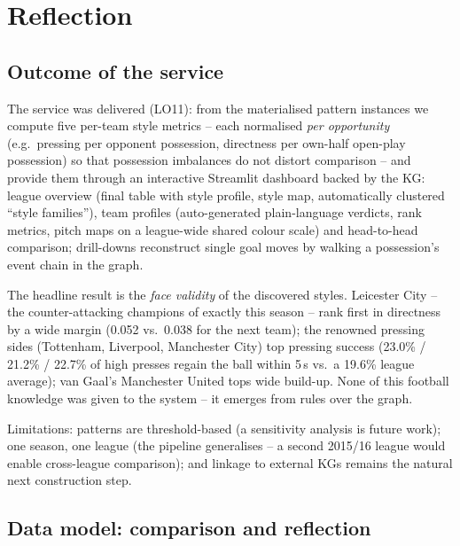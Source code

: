\documentclass[11pt,a4paper]{article}
\begin{document}
\section{Reflection}

\subsection{Outcome of the service}
\label{sec:service-outcome}

The service was delivered (LO11): from the materialised pattern instances we
compute five per-team style metrics -- each normalised \emph{per opportunity}
(e.g.\ pressing per opponent possession, directness per own-half open-play
possession) so that possession imbalances do not distort comparison -- and
provide them through an interactive Streamlit dashboard backed by the KG:
league overview (final table with style profile, style map, automatically
clustered ``style families''), team profiles (auto-generated plain-language
verdicts, rank metrics, pitch maps on a league-wide shared colour scale) and
head-to-head comparison; drill-downs reconstruct single goal moves by walking a
possession's event chain in the graph.

The headline result is the \emph{face validity} of the discovered styles.
Leicester City -- the counter-attacking champions of exactly this season -- rank
first in directness by a wide margin (0.052 vs.\ 0.038 for the next team); the
renowned pressing sides (Tottenham, Liverpool, Manchester City) top pressing
success (23.0\% / 21.2\% / 22.7\% of high presses regain the ball within 5\,s
vs.\ a 19.6\% league average); van Gaal's Manchester United tops wide build-up.
None of this football knowledge was given to the system -- it emerges from rules
over the graph.


Limitations: patterns are threshold-based (a sensitivity analysis is future
work); one season, one league (the pipeline generalises -- a second 2015/16
league would enable cross-league comparison); and linkage to external KGs
remains the natural next construction step.

\subsection{Data model: comparison and reflection}
\label{sec:datamodel}
\end{document}
